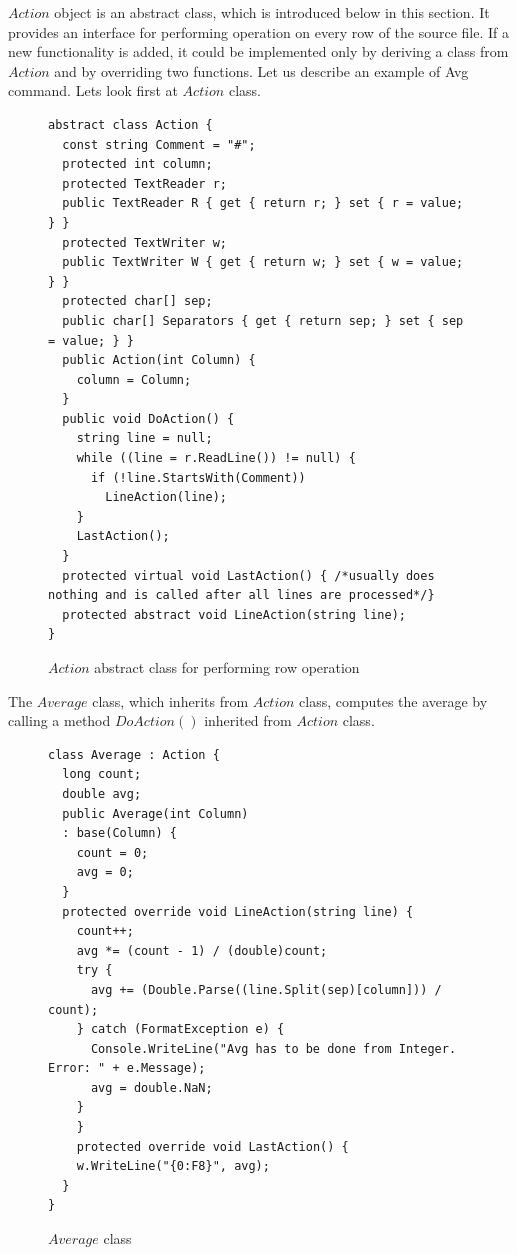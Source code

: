   $Action$ object is an abstract class, which is introduced below in this section. It provides
  an interface for performing operation on every row of the source file.
  If a new functionality is added, it could be implemented only by deriving 
  a class from $Action$ and by overriding
  two functions. Let us describe an example of Avg command. Lets look first at $Action$ class.
\begin{figure}[!hbp]
\begin{lstlisting}
abstract class Action {
  const string Comment = "#";
  protected int column;
  protected TextReader r;
  public TextReader R { get { return r; } set { r = value; } }
  protected TextWriter w;
  public TextWriter W { get { return w; } set { w = value; } }
  protected char[] sep;
  public char[] Separators { get { return sep; } set { sep = value; } }
  public Action(int Column) {
    column = Column;
  }
  public void DoAction() {
    string line = null;
    while ((line = r.ReadLine()) != null) {
      if (!line.StartsWith(Comment))
        LineAction(line);
    }
    LastAction();
  }
  protected virtual void LastAction() { /*usually does nothing and is called after all lines are processed*/}
  protected abstract void LineAction(string line);
}
\end{lstlisting}
\caption{$Action$ abstract class for performing row operation}\label{action}
\end{figure}

  The $Average$ class, which inherits from $Action$ class, computes 
  the average by calling a method $DoAction()$ inherited from $Action$ class. 

\begin{figure}[!hbp]
\begin{lstlisting}
class Average : Action {
  long count;
  double avg;
  public Average(int Column)
  : base(Column) {
    count = 0;
    avg = 0;
  }
  protected override void LineAction(string line) {
    count++;
    avg *= (count - 1) / (double)count;
    try {
      avg += (Double.Parse((line.Split(sep)[column])) / count);
    } catch (FormatException e) {
      Console.WriteLine("Avg has to be done from Integer. Error: " + e.Message);
      avg = double.NaN;
    }
    }
    protected override void LastAction() {
    w.WriteLine("{0:F8}", avg);
  }
}
\end{lstlisting}
\caption{$Average$ class}\label{average}
\end{figure}


